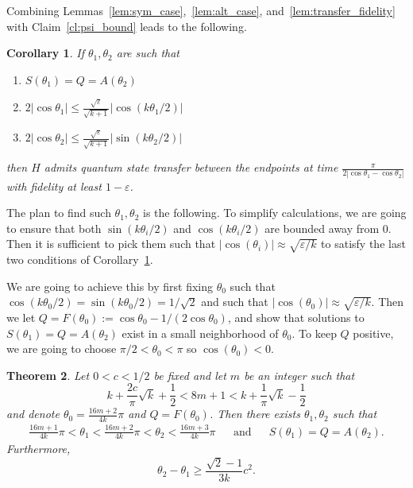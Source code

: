 \documentclass{article}
\newtheorem{theorem}{Theorem}
\newtheorem{corollary}[theorem]{Corollary}
\theoremstyle{definition}
\numberwithin{equation}{section}
\numberwithin{theorem}{section}
\newcommand{\ep}{\varepsilon}
\begin{document}
Combining Lemmas~\ref{lem:sym_case},~\ref{lem:alt_case}, and~\ref{lem:transfer_fidelity} with Claim~\ref{cl:psi_bound} leads to the following. 
\begin{corollary}\label{cor:transfer}
  If $\theta_1, \theta_2$ are such that   
  \begin{enumerate}
      \item $S(\theta_1) = Q = A(\theta_2)$
      \item $2|\cos\theta_1| \leq \tfrac{\sqrt{\ep}}{\sqrt{k+1}} |\cos(k\theta_1/2)|$
      \item $2|\cos \theta_2| \leq \tfrac{\sqrt{\ep}}{\sqrt{k+1}} |\sin(k\theta_2/2)|$
  \end{enumerate} then $H$ admits quantum state transfer between the endpoints at time $\tfrac{\pi}{2|\cos \theta_1 - \cos \theta_2|}$ with fidelity at least $1-\ep$.
\end{corollary}

The plan to find such $\theta_1, \theta_2$ is the following. To simplify calculations, we are going to ensure that both $\sin(k\theta_i/2)$ and $\cos(k\theta_i/2)$ are bounded away from 0. Then it is sufficient to pick them such that $|\cos(\theta_i)| \approx \sqrt{\ep/k}$ to satisfy the last two conditions of Corollary~\ref{cor:transfer}.

We are going to achieve this by first fixing $\theta_0$ such that $\cos(k\theta_0/2)=\sin(k\theta_0/2) = 1/\sqrt{2}$ and such that $|\cos(\theta_0)| \approx \sqrt{\ep/k}$. Then we let $Q = F(\theta_0):= \cos\theta_0 - 1/(2\cos \theta_0)$, and show that solutions to $S(\theta_1) = Q = A(\theta_2)$ exist in a small neighborhood of $\theta_0$. To keep $Q$ positive, we are going to choose $\pi/2 < \theta_0 < \pi$ so $\cos(\theta_0) < 0$. 

\begin{theorem}\label{thm:picktheta} Let $0<c<1/2$ be fixed and let $m$ be an integer such that 
\begin{equation}\label{eq:m_cond} 
k+\frac{2c}{\pi}\sqrt{k}+\frac{1}{2} < 8m+1 < k + \frac{1}{\pi}\sqrt{k}-\frac{1}{2}
\end{equation} 
and denote \(\theta_0 = \tfrac{16m+2}{4k}\pi\) and \(Q = F(\theta_0)\). Then there exists $\theta_1, \theta_2$ such that 
    \begin{align*}\frac{16m+1}{4k} \pi < \theta_1 < \frac{16m+2}{4k}\pi < \theta_2 < \frac{16m+3}{4k}\pi  && \mbox{and} && S(\theta_1)= Q = A(\theta_2).\end{align*}
Furthermore, \[\theta_2-\theta_1 \geq \frac{\sqrt{2}-1}{3k}c^2.\]
\end{theorem}
\end{document}
